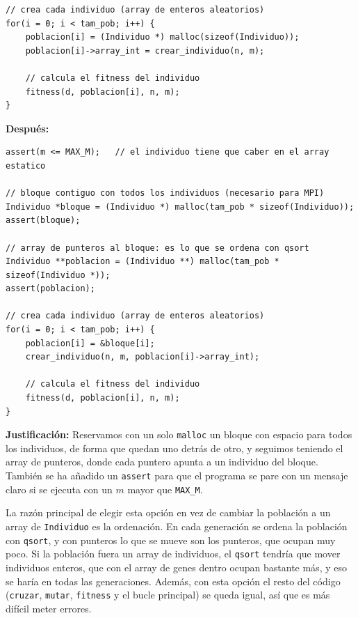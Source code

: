 \documentclass[12pt]{article}
\begin{document}
\begin{enumerate}
\begin{lstlisting}[style=EstiloC]
// crea cada individuo (array de enteros aleatorios)
for(i = 0; i < tam_pob; i++) {
    poblacion[i] = (Individuo *) malloc(sizeof(Individuo));
    poblacion[i]->array_int = crear_individuo(n, m);

    // calcula el fitness del individuo
    fitness(d, poblacion[i], n, m);
}
\end{lstlisting}

\noindent\textbf{Después:}
\begin{lstlisting}[style=EstiloC]
assert(m <= MAX_M);   // el individuo tiene que caber en el array estatico

// bloque contiguo con todos los individuos (necesario para MPI)
Individuo *bloque = (Individuo *) malloc(tam_pob * sizeof(Individuo));
assert(bloque);

// array de punteros al bloque: es lo que se ordena con qsort
Individuo **poblacion = (Individuo **) malloc(tam_pob * sizeof(Individuo *));
assert(poblacion);

// crea cada individuo (array de enteros aleatorios)
for(i = 0; i < tam_pob; i++) {
    poblacion[i] = &bloque[i];
    crear_individuo(n, m, poblacion[i]->array_int);

    // calcula el fitness del individuo
    fitness(d, poblacion[i], n, m);
}
\end{lstlisting}

\textbf{Justificación:} Reservamos con un solo \texttt{malloc} un bloque con espacio para todos los individuos, de forma que quedan uno detrás de otro, y seguimos teniendo el array de punteros, donde cada puntero apunta a un individuo del bloque. También se ha añadido un \texttt{assert} para que el programa se pare con un mensaje claro si se ejecuta con un $m$ mayor que \texttt{MAX\_M}.

La razón principal de elegir esta opción en vez de cambiar la población a un array de \texttt{Individuo} es la ordenación. En cada generación se ordena la población con \texttt{qsort}, y con punteros lo que se mueve son los punteros, que ocupan muy poco. Si la población fuera un array de individuos, el \texttt{qsort} tendría que mover individuos enteros, que con el array de genes dentro ocupan bastante más, y eso se haría en todas las generaciones. Además, con esta opción el resto del código (\texttt{cruzar}, \texttt{mutar}, \texttt{fitness} y el bucle principal) se queda igual, así que es más difícil meter errores.

\vspace{0.5cm}



\end{enumerate}
\end{document}
